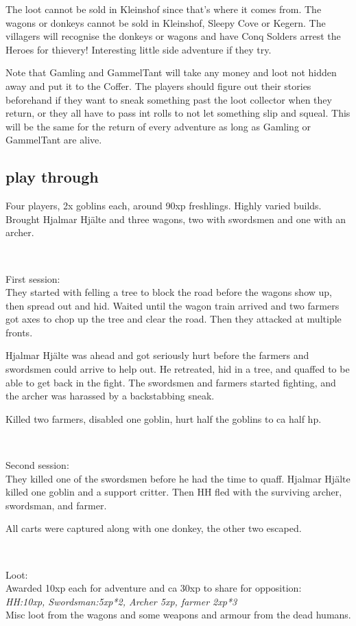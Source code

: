 The loot cannot be sold in Kleinshof since that's where it comes from. The wagons or donkeys cannot be sold in Kleinshof, Sleepy Cove or Kegern. The villagers will recognise the donkeys or wagons and have Conq Solders arrest the Heroes for thievery! Interesting little side adventure if they try.

Note that Gamling and GammelTant will take any money and loot not hidden away and put it to the Coffer. The players should figure out their stories beforehand if they want to sneak something past the loot collector when they return, or they all have to pass int rolls to not let something slip and squeal. This will be the same for the return of every adventure as long as Gamling or GammelTant are alive.


\subsection*{play through}

Four players, 2x goblins each, around 90xp freshlings. Highly varied builds.
Brought Hjalmar Hjälte and three wagons, two with swordsmen and one with an archer.

\

First session: \\
They started with felling a tree to block the road before the wagons show up, then spread out and hid. Waited until the wagon train arrived and two farmers got axes to chop up the tree and clear the road. Then they attacked at multiple fronts.

Hjalmar Hjälte was ahead and got seriously hurt before the farmers and swordsmen could arrive to help out. He retreated, hid in a tree, and quaffed to be able to get back in the fight. The swordsmen and farmers started fighting, and the archer was harassed by a backstabbing sneak.

Killed two farmers, disabled one goblin, hurt half the goblins to ca half hp.

\

Second session: \\
They killed one of the swordsmen before he had the time to quaff. Hjalmar Hjälte killed one goblin and a support critter. Then HH fled with the surviving archer, swordsman, and farmer.

All carts were captured along with one donkey, the other two escaped.

\

Loot: \\
Awarded 10xp each for adventure and ca 30xp to share for opposition:\\
\emph{HH:10xp, Swordsman:5xp*2, Archer 5xp, farmer 2xp*3}\\
Misc loot from the wagons and some weapons and armour from the dead humans.

